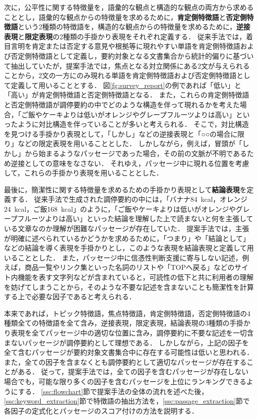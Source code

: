 \documentclass[japanese]{jnlp_1.4}
\begin{document}
次に，公平性に関する特徴量を，語彙的な観点と構造的な観点の両方から求めることとし，語彙的な観点からの特徴量を求めるために，{\bf 肯定側特徴語}と{\bf 否定側特徴語}という2種類の特徴語を，構造的な観点からの特徴量を求めるために，{\bf 逆接表現}と{\bf 限定表現}の2種類の手掛かり表現をそれぞれ定義する．
従来手法では，着目言明を肯定または否定する意見や根拠等に現れやすい単語を肯定側特徴語および否定側特徴語として定義し，要約対象となる文書集合から統計的偏りに基づいて抽出していたが，提案手法では，焦点となる対立関係にある2文が与えられることから，2文の一方にのみ現れる単語を肯定側特徴語および否定側特徴語として定義して用いることとする．
図\ref{fg:survey_report}の例であれば「低い」と「高い」が肯定側特徴語と否定側特徴語となる．
また，これらの肯定側特徴語と否定側特徴語が調停要約の中でどのような構造を伴って現れるかを考えた場合，「ご飯やケーキよりは低いがオレンジやグレープフルーツよりは高い」といったように対比構造を伴っていることが多いと考えられる．
そこで，対比構造を見つける手掛かり表現として，「しかし」などの逆接表現と「○○の場合に限り」などの限定表現を用いることとした．
しかしながら，例えば，冒頭が「しかし」から始まるようなパッセージであった場合，その前の文脈が不明であるため逆接としての意味をなさない．
それゆえ，パッセージ中に現れる位置を考慮して，これらの手掛かり表現を用いることとした．

最後に，簡潔性に関する特徴量を求めるための手掛かり表現として{\bf 結論表現}を定義する．
従来手法で生成された調停要約の中には，「バナナ84~kcal，オレンジ24~kcal，ご飯168~kcal」のように，「ご飯やケーキよりは低いがオレンジやグレープフルーツよりは高い」といった結論を理解した上で読まないと何を主張している文章なのか理解が困難なパッセージが存在していた．
提案手法では，主張が明確に述べられているかどうかを求めるために，「つまり」や「結論として」などの結論を導く表現を手掛かりとし，このような表現を結論表現と定義して用いることとした．
また，パッセージ中に信憑性判断支援に寄与しない記述，例えば，商品一覧やリンク集といった名詞のリストや「TOPへ戻る」などのサイト内機能を表す文字列などが含まれていると，可読性の低下と共に利用者の理解を妨げてしまうことから，そのような不要な記述を含まないことも簡潔性を計算する上で必要な因子であると考えられる．

本来であれば，トピック特徴語，焦点特徴語，肯定側特徴語，否定側特徴語の4種類全ての特徴語を全て含み，逆接表現，限定表現，結論表現の3種類の手掛かり表現を全てパッセージ中の適切な位置に含み，調停要約に不要な記述を一切含まないパッセージが調停要約として理想である．
しかしながら，上記の因子を全て含むパッセージが要約対象文書集合中に存在する可能性は低いと思われる．
また，全ての因子を含まなくとも調停要約として適切なパッセージが存在することがある．
従って，提案手法では，全ての因子を含むパッセージが存在しない場合でも，可能な限り多くの因子を含むパッセージを上位にランキングできるようにする．
\ref{ssc:flowchart}節で提案手法の全体の流れを述べた後，\ref{ssc:keyword_extraction}節で特徴語の抽出方法を，\ref{ssc:passage_extraction}節で各因子の定式化とパッセージのスコア付けの方法を説明する．
\end{document}

